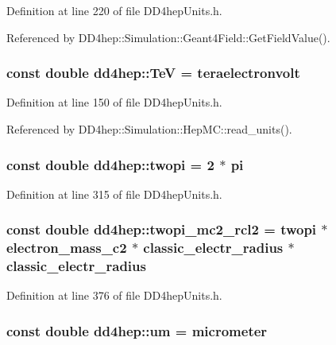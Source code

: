 Definition at line 220 of file DD4hepUnits.h.

Referenced by DD4hep::Simulation::Geant4Field::GetFieldValue().\hypertarget{namespacedd4hep_a7c925bf28d6b294f8f120a69deb6fe02}{
\subsubsection[{TeV}]{\setlength{\rightskip}{0pt plus 5cm}const double {\bf dd4hep::TeV} = {\bf teraelectronvolt}}}
\label{namespacedd4hep_a7c925bf28d6b294f8f120a69deb6fe02}


Definition at line 150 of file DD4hepUnits.h.

Referenced by DD4hep::Simulation::HepMC::read\_\-units().\hypertarget{namespacedd4hep_ae89c0c70c74b5fd0c1972865846822d7}{
\subsubsection[{twopi}]{\setlength{\rightskip}{0pt plus 5cm}const double {\bf dd4hep::twopi} = 2 $\ast$ {\bf pi}}}
\label{namespacedd4hep_ae89c0c70c74b5fd0c1972865846822d7}


Definition at line 315 of file DD4hepUnits.h.\hypertarget{namespacedd4hep_a5db1b84c8dc851581b5ba57b661f575f}{
\subsubsection[{twopi\_\-mc2\_\-rcl2}]{\setlength{\rightskip}{0pt plus 5cm}const double {\bf dd4hep::twopi\_\-mc2\_\-rcl2} = {\bf twopi} $\ast$ {\bf electron\_\-mass\_\-c2} $\ast$ {\bf classic\_\-electr\_\-radius} $\ast$ {\bf classic\_\-electr\_\-radius}}}
\label{namespacedd4hep_a5db1b84c8dc851581b5ba57b661f575f}


Definition at line 376 of file DD4hepUnits.h.\hypertarget{namespacedd4hep_a7ca6a7ec6a20ddb5678bd46c47996d26}{
\subsubsection[{um}]{\setlength{\rightskip}{0pt plus 5cm}const double {\bf dd4hep::um} = {\bf micrometer}}}
\label{namespacedd4hep_a7ca6a7ec6a20ddb5678bd46c47996d26}


